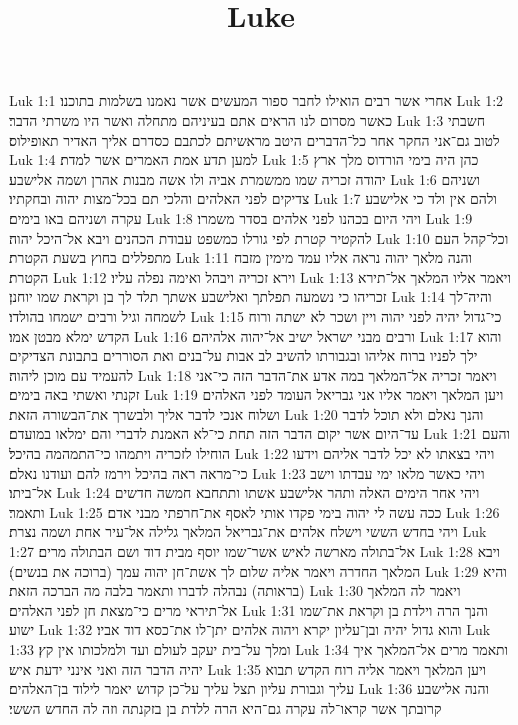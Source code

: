 

\title{Luke}

Luk 1:1  אחרי אשר רבים הואילו לחבר ספור המעשים אשר נאמנו בשלמות בתוכנו׃
Luk 1:2  כאשר מסרום לנו הראים אתם בעיניהם מתחלה ואשר היו משרתי הדבר׃
Luk 1:3  חשבתי לטוב גם־אני החקר אחר כל־הדברים היטב מראשיתם לכתבם כסדרם אליך האדיר תאופילוס׃
Luk 1:4  למען תדע אמת האמרים אשר למדת׃
Luk 1:5  כהן היה בימי הורדוס מלך ארץ יהודה זכריה שמו ממשמרת אביה ולו אשה מבנות אהרן ושמה אלישבע׃
Luk 1:6  ושניהם צדיקים לפני האלהים והלכי תם בכל־מצות יהוה ובחקתיו׃
Luk 1:7  ולהם אין ולד כי אלישבע עקרה ושניהם באו בימים׃
Luk 1:8  ויהי היום בכהנו לפני אלהים בסדר משמרו׃
Luk 1:9  להקטיר קטרת לפי גורלו כמשפט עבודת הכהנים ויבא אל־היכל יהוה׃
Luk 1:10  וכל־קהל העם מתפללים בחוץ בשעת הקטרת׃
Luk 1:11  והנה מלאך יהוה נראה אליו עמד מימין מזבח הקטרת׃
Luk 1:12  וירא זכריה ויבהל ואימה נפלה עליו׃
Luk 1:13  ויאמר אליו המלאך אל־תירא זכריהו כי נשמעה תפלתך ואלישבע אשתך תלד לך בן וקראת שמו יוחנן׃
Luk 1:14  והיה־לך לשמחה וגיל ורבים ישמחו בהולדו׃
Luk 1:15  כי־גדול יהיה לפני יהוה ויין ושכר לא ישתה ורוח הקדש ימלא מבטן אמו׃
Luk 1:16  ורבים מבני ישראל ישיב אל־יהוה אלהיהם׃
Luk 1:17  והוא ילך לפניו ברוח אליהו ובגבורתו להשיב לב אבות על־בנים ואת הסוררים בתבונת הצדיקים להעמיד עם מוכן ליהוה׃
Luk 1:18  ויאמר זכריה אל־המלאך במה אדע את־הדבר הזה כי־אני זקנתי ואשתי באה בימים׃
Luk 1:19  ויען המלאך ויאמר אליו אני גבריאל העומד לפני האלהים ושלוח אנכי לדבר אליך ולבשרך את־הבשורה הזאת׃
Luk 1:20  והנך נאלם ולא תוכל לדבר עד־היום אשר יקום הדבר הזה תחת כי־לא האמנת לדברי והם ימלאו במועדם׃
Luk 1:21  והעם הוחילו לזכריה ויתמהו כי־התמהמה בהיכל׃
Luk 1:22  ויהי בצאתו לא יכל לדבר אליהם וידעו כי־מראה ראה בהיכל וירמז להם ועודנו נאלם׃
Luk 1:23  ויהי כאשר מלאו ימי עבדתו וישב אל־ביתו׃
Luk 1:24  ויהי אחר הימים האלה ותהר אלישבע אשתו ותתחבא חמשה חדשים ותאמר׃
Luk 1:25  ככה עשה לי יהוה בימי פקדו אותי לאסף את־חרפתי מבני אדם׃
Luk 1:26  ויהי בחדש הששי וישלח אלהים את־גבריאל המלאך גלילה אל־עיר אחת ושמה נצרת׃
Luk 1:27  אל־בתולה מארשה לאיש אשר־שמו יוסף מבית דוד ושם הבתולה מרים׃
Luk 1:28  ויבא המלאך החדרה ויאמר אליה שלום לך אשת־חן יהוה עמך (ברוכה את בנשים)׃
Luk 1:29  והיא (בראותה) נבהלה לדברו ותאמר בלבה מה הברכה הזאת׃
Luk 1:30  ויאמר לה המלאך אל־תיראי מרים כי־מצאת חן לפני האלהים׃
Luk 1:31  והנך הרה וילדת בן וקראת את־שמו ישוע׃
Luk 1:32  והוא גדול יהיה ובן־עליון יקרא ויהוה אלהים יתן־לו את־כסא דוד אביו׃
Luk 1:33  ומלך על־בית יעקב לעולם ועד ולמלכותו אין קץ׃
Luk 1:34  ותאמר מרים אל־המלאך איך יהיה הדבר הזה ואני אינני ידעת איש׃
Luk 1:35  ויען המלאך ויאמר אליה רוח הקדש תבוא עליך וגבורת עליון תצל עליך על־כן קדוש יאמר לילוד בן־האלהים׃
Luk 1:36  והנה אלישבע קרובתך אשר קראו־לה עקרה גם־היא הרה ללדת בן בזקנתה וזה לה החדש הששי׃
